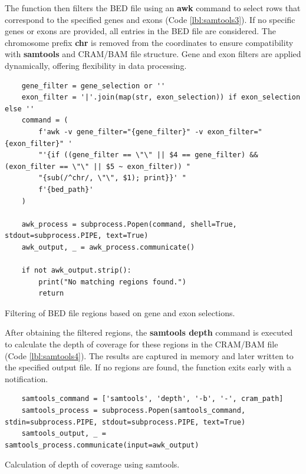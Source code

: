 The function then filters the BED file using an \textbf{awk} command to select rows that correspond to the specified genes and exons (Code \ref{lbl:samtools3}). If no specific genes or exons are provided, all entries in the BED file are considered. The chromosome prefix \textbf{chr} is removed from the coordinates to ensure compatibility with \textbf{samtools} and CRAM/BAM file structure. Gene and exon filters are applied dynamically, offering flexibility in data processing.

\begin{listing}[H]
\begin{verbatim}
    gene_filter = gene_selection or ''
    exon_filter = '|'.join(map(str, exon_selection)) if exon_selection else ''
    command = (
        f'awk -v gene_filter="{gene_filter}" -v exon_filter="{exon_filter}" '
        "'{if ((gene_filter == \"\" || $4 == gene_filter) && (exon_filter == \"\" || $5 ~ exon_filter)) "
        "{sub(/^chr/, \"\", $1); print}}' "
        f'{bed_path}'
    )
    
    awk_process = subprocess.Popen(command, shell=True, stdout=subprocess.PIPE, text=True)
    awk_output, _ = awk_process.communicate()

    if not awk_output.strip():
        print("No matching regions found.")
        return
\end{verbatim}
\caption{Filtering of BED file regions based on gene and exon selections.}
\label{lbl:samtools3}
\end{listing}

After obtaining the filtered regions, the \textbf{samtools depth} command is executed to calculate the depth of coverage for these regions in the CRAM/BAM file (Code \ref{lbl:samtools4}). The results are captured in memory and later written to the specified output file. If no regions are found, the function exits early with a notification.

\begin{listing}[H]
\begin{verbatim}
    samtools_command = ['samtools', 'depth', '-b', '-', cram_path]
    samtools_process = subprocess.Popen(samtools_command, stdin=subprocess.PIPE, stdout=subprocess.PIPE, text=True)
    samtools_output, _ = samtools_process.communicate(input=awk_output)
\end{verbatim}
\caption{Calculation of depth of coverage using samtools.}
\label{lbl:samtools4}
\end{listing}

